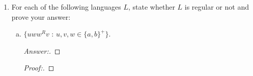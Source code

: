 \documentclass[10pt]{article}
\begin{document}
\begin{enumerate}[1)]
\begin{enumerate}[a)]
\item
$\{w \in \{0, 1\}^* : \#_0(w) \neq \#_1(w)\}$.
\begin{proof}[Answer:]
\end{proof}
\begin{proof}[Proof:]
\end{proof}

\item
* $\{w \in \{a, b\}^* : \exists x \in \{a, b\}^+\ (w = xx^Rx)\}$
\begin{proof}[Answer:]
\end{proof}
\begin{proof}[Proof:]
\end{proof}

\item
$\{w \in \{a, b\}^*$ : the number of occurrences of the substring \texttt{ab} equals the number of occurrences of the substring \texttt{ba}\}.
\begin{proof}[Answer:]
\end{proof}
\begin{proof}[Proof:]
\end{proof}

\item
* $\{w: w \in \{a – z\}^*$ and the letters of $w$ appear in reverse alphabetical order\}.  For example, \texttt{spoonfeed} $\in L$.
\begin{proof}[Answer:]
\end{proof}
\begin{proof}[Proof:]
\end{proof}

\item
$L_0^*$, where $L_0 = \{ba^ib^ja^k,\ j \geq 0,\ 0 \leq i \leq k\}$.
\begin{proof}[Answer:]
\end{proof}
\begin{proof}[Proof:]
\end{proof}
\end{enumerate}


\item
For each of the following languages $L$, state whether $L$ is regular or not and prove your answer:
\begin{enumerate}[a)]
\item
$\{uww^Rv$ : $u, v, w \in \{a, b\}^+\}$.
\begin{proof}[Answer:]
\end{proof}
\begin{proof}[Proof:]
\end{proof}


\end{enumerate}
\end{enumerate}
\end{document}
